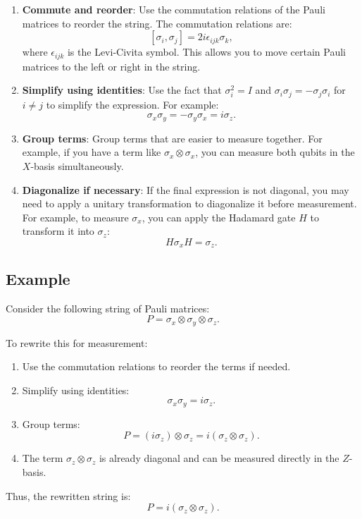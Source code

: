 \documentclass{article}
\begin{document}
\begin{enumerate}
   \item \textbf{Commute and reorder}: Use the commutation relations of the Pauli matrices to reorder the string. The commutation relations are:
   \[
   [\sigma_i, \sigma_j] = 2i \epsilon_{ijk} \sigma_k,
   \]
   where $\epsilon_{ijk}$ is the Levi-Civita symbol. This allows you to move certain Pauli matrices to the left or right in the string.

   \item \textbf{Simplify using identities}: Use the fact that $\sigma_i^2 = I$ and $\sigma_i \sigma_j = -\sigma_j \sigma_i$ for $i \neq j$ to simplify the expression. For example:
   \[
   \sigma_x \sigma_y = -\sigma_y \sigma_x = i \sigma_z.
   \]

   \item \textbf{Group terms}: Group terms that are easier to measure together. For example, if you have a term like $\sigma_x \otimes \sigma_x$, you can measure both qubits in the $X$-basis simultaneously.

   \item \textbf{Diagonalize if necessary}: If the final expression is not diagonal, you may need to apply a unitary transformation to diagonalize it before measurement. For example, to measure $\sigma_x$, you can apply the Hadamard gate $H$ to transform it into $\sigma_z$:
   \[
   H \sigma_x H = \sigma_z.
   \]
\end{enumerate}

\subsection*{Example}

Consider the following string of Pauli matrices:
\[
P = \sigma_x \otimes \sigma_y \otimes \sigma_z.
\]

To rewrite this for measurement:

\begin{enumerate}
   \item Use the commutation relations to reorder the terms if needed.
   \item Simplify using identities:
   \[
   \sigma_x \sigma_y = i \sigma_z.
   \]
   \item Group terms:
   \[
   P = (i \sigma_z) \otimes \sigma_z = i (\sigma_z \otimes \sigma_z).
   \]
   \item The term $\sigma_z \otimes \sigma_z$ is already diagonal and can be measured directly in the $Z$-basis.
\end{enumerate}

Thus, the rewritten string is:
\[
P = i (\sigma_z \otimes \sigma_z).
\]
\end{document}
